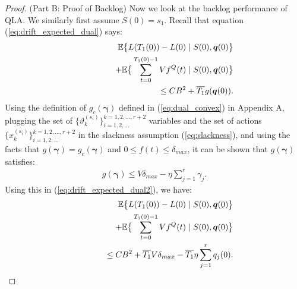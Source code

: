 \documentclass[journal]{IEEEtran}
\newcommand{\expect}[1]{\mathbb{E}\big\{#1\big\}}
\newcommand{\bv}[1]{{\boldsymbol{#1} }}
\begin{document}
\begin{proof}




(Part B: Proof of Backlog) Now we look at the backlog performance of QLA. We similarly first assume $S(0)=s_1$. 
Recall that equation (\ref{eq:drift_expected_dual}) says:
\begin{eqnarray}
\hspace{-.3in}&&\expect{L(T_{1}(0))-L(0)\left.|\right. S(0), \bv{q}(0)} \label{eq:drift_expected_dual2} \\
\hspace{-.3in}&& \qquad\qquad\qquad+ \expect{\sum_{t=0}^{T_{1}(0)-1}Vf^Q(t)\left.|\right. S(0), \bv{q}(0)}\nonumber\\
\hspace{-.3in}&& \qquad\quad \leq  CB^2 + \overline{T_1} g(\bv{q}(0)).\nonumber
\end{eqnarray}
Using the definition of $g_c(\bv{\gamma})$ defined in (\ref{eq:dual_convex}) in Appendix A, plugging the set of $\{\vartheta^{(s_i)}_k\}_{i=1, 2, ...}^{k=1, 2, ..., r+2}$ variables and the set of actions $\{x^{(s_i)}_k\}_{i=1, 2, ...}^{k=1,2, ..., r+2}$ in the slackness assumption (\ref{eq:slackness}), and using the facts that $g(\bv{\gamma})=g_c(\bv{\gamma})$ and $0\leq f(t)\leq\delta_{max}$, it can be shown that $g(\bv{\gamma})$ satisfies: 
\begin{eqnarray}
g(\bv{\gamma}) \leq V\delta_{max} - \eta \sum_{j=1}^r \gamma_j.\label{eq:dualproperty}
\end{eqnarray}
Using this in (\ref{eq:drift_expected_dual2}), we have: 
\begin{eqnarray}
\hspace{-.3in}&&\expect{L(T_{1}(0))-L(0)\left.|\right. S(0), \bv{q}(0)} \\
\hspace{-.3in}&& \qquad\qquad\qquad+ \expect{\sum_{t=0}^{T_{1}(0)-1}Vf^Q(t)\left.|\right. S(0), \bv{q}(0)}\nonumber\\
\hspace{-.3in}&& \qquad\quad  \leq CB^2 + \overline{T_1}V\delta_{max} - \overline{T_1}\eta\sum_{j=1}^rq_j(0).\nonumber

\end{eqnarray}
\end{proof}
\end{document}
